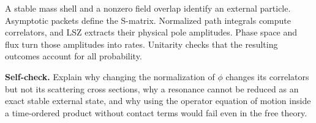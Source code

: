 \documentclass[11pt]{article}
\begin{document}
\begin{keyidea}
A stable mass shell and a nonzero field overlap identify an external
particle. Asymptotic packets define the S-matrix. Normalized path integrals
compute correlators, and LSZ extracts their physical pole amplitudes.
Phase space and flux turn those amplitudes into rates. Unitarity checks
that the resulting outcomes account for all probability.
\end{keyidea}
\textbf{Self-check.} Explain why changing the normalization of \(\phi\)
changes its correlators but not its scattering cross sections, why a
resonance cannot be reduced as an exact stable external state, and why
using the operator equation of motion inside a time-ordered product without
contact terms would fail even in the free theory.
\end{document}
